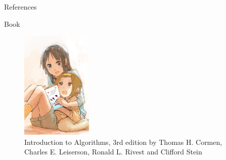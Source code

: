 \documentclass[ignorenonframetext,]{beamer}
\begin{document}
\begin{frame}{References}
\protect\hypertarget{references-1}{}

\begin{block}{Book}

\begin{figure}
\centering
\includegraphics[width=\textwidth,height=2.04167in]{K_on_girls_reading_cormen_algorithms.jpg}
\caption{Introduction to Algorithms, 3rd edition by Thomas H. Cormen,
Charles E. Leiserson, Ronald L. Rivest and Clifford Stein}
\end{figure}

\end{block}

\end{frame}
\end{document}
